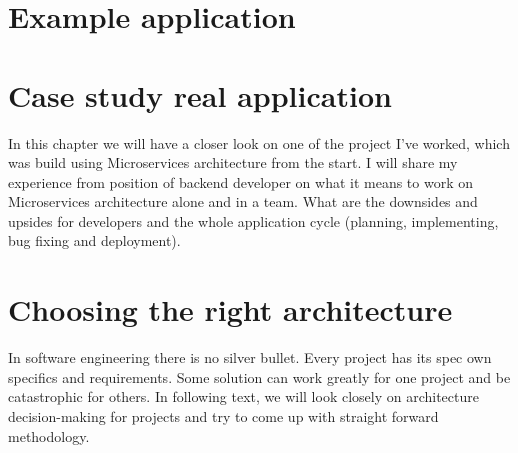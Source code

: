




\chapter{Example application}


\chapter{Case study real application}
\label{chapter:personal_experience}
In this chapter we will have a closer look on one of the project I've worked, which was build using Microservices architecture from the start. I will share my experience from position of backend developer on what it means to work on Microservices architecture alone and in a team. What are the downsides and upsides for developers and the whole application cycle (planning, implementing, bug fixing and deployment).



\chapter{Choosing the right architecture}
In software engineering there is no silver bullet. Every project has its spec own specifics and requirements. Some solution can work greatly for one project and be catastrophic for others. In following text, we will look closely on architecture decision-making for projects and try to come up with straight forward methodology.

